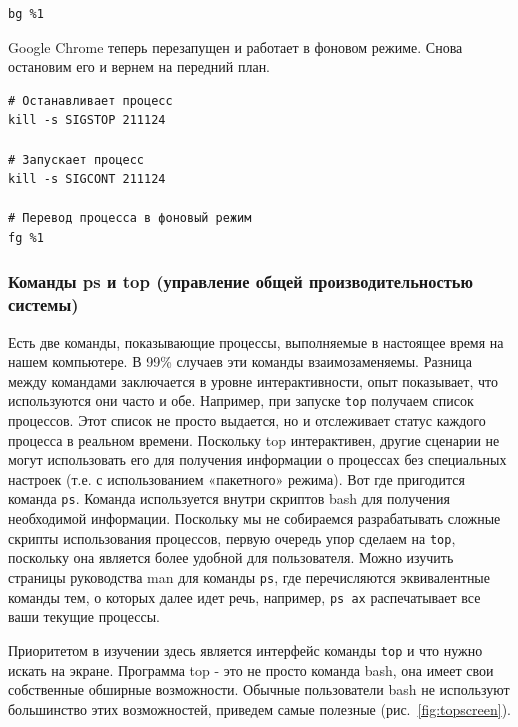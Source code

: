 \documentclass[12pt]{article}
\begin{document}
\begin{verbatim}
bg %1
\end{verbatim}

Google Chrome теперь перезапущен и работает в фоновом режиме. Снова
остановим его и вернем на передний план.

\begin{verbatim}
# Останавливает процесс
kill -s SIGSTOP 211124

# Запускает процесс
kill -s SIGCONT 211124

# Перевод процесса в фоновый режим
fg %1
\end{verbatim}

\hypertarget{ps-and-top-commands-system-performance-management}{%
\subsubsection{\texorpdfstring{\protect\hyperlink{ps-and-top-commands-system-performance-management}{}Команды
ps и top (управление общей производительностью
системы)}{Команды ps и top (управление общей производительностью системы)}}\label{ps-and-top-commands-system-performance-management}}

Есть две команды, показывающие процессы, выполняемые в настоящее время
на нашем компьютере. В 99\% случаев эти команды взаимозаменяемы. Разница
между командами заключается в уровне интерактивности, опыт показывает,
что используются они часто и обе. Например, при запуске \texttt{top}
получаем список процессов. Этот список не просто выдается, но и
отслеживает статус каждого процесса в реальном времени. Поскольку top
интерактивен, другие сценарии не могут использовать его для получения
информации о процессах без специальных настроек (т.е. с использованием
«пакетного» режима). Вот где пригодится команда \texttt{ps}. Команда
используется внутри скриптов bash для получения необходимой информации.
Поскольку мы не собираемся разрабатывать сложные скрипты использования
процессов, первую очередь упор сделаем на \texttt{top}, поскольку она
является более удобной для пользователя. Можно изучить страницы
руководства man для команды \texttt{ps}, где перечисляются эквивалентные
команды тем, о которых далее идет речь, например, \texttt{ps\ ax}
распечатывает все ваши текущие процессы.

Приоритетом в изучении здесь является интерфейс команды \texttt{top} и
что нужно искать на экране. Программа top - это не просто команда bash,
она имеет свои собственные обширные возможности. Обычные пользователи
bash не используют большинство этих возможностей, приведем самые
полезные (рис.~\ref{fig:topscreen}).
\end{document}
